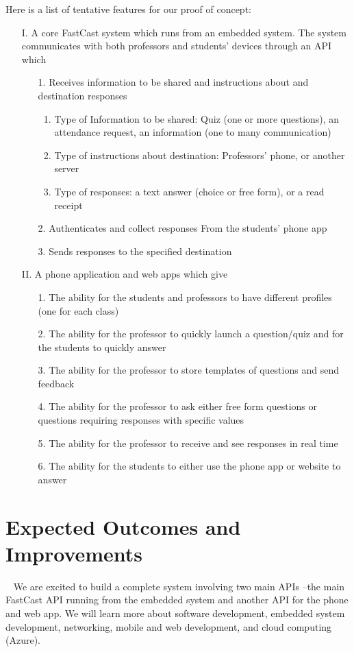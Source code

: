 \documentclass[10pt, a4paper]{article}
\begin{document}
Here is a list of tentative features for our proof of concept:
\begin{enumerate}
\item[I.] A core FastCast system which runs from an embedded system. The system communicates with both professors and students' devices through an API which
\begin{enumerate}
    \item[1. ] Receives information to be shared and instructions about and destination responses
    \begin{enumerate}
        \item Type of Information to be shared: Quiz (one or more questions), an attendance request, an information (one to many communication)
        \item Type of instructions about destination: Professors' phone, or another server
        \item Type of responses: a text answer (choice or free form), or a read receipt
    \end{enumerate}
    \item[2. ] Authenticates and collect responses From the students' phone app
    \item[3. ] Sends responses to the specified destination
\end{enumerate}
\item[II.] A phone application and web apps which give
\begin{enumerate}
    \item[1. ] The ability for the students and professors to have different profiles (one for each class)
    \item[2. ] The ability for the professor to quickly launch a question/quiz and for the students to quickly answer
    \item[3. ] The ability for the professor to store templates of questions and send feedback
    \item[4. ] The ability for the professor to ask either free form questions or questions requiring responses with specific values
    \item[5. ] The ability for the professor to receive and see responses in real time 
    \item[6. ] The ability for the students to either use the phone app or website to answer
\end{enumerate}

\end{enumerate}

\section{Expected Outcomes and Improvements}
\par ~ We are excited to build a complete system involving two main APIs --the main FastCast API running from the embedded system and another API for the phone and web app. We will learn more about software development, embedded system development, networking, mobile and web development, and cloud computing (Azure).
\end{document}
